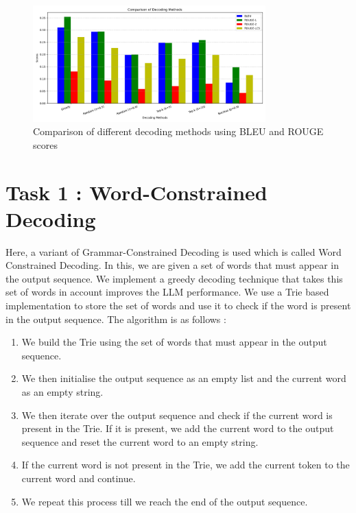 \documentclass[12pt]{article}
\begin{document}
\begin{figure}[htbp]
    \centering
    \includegraphics[width=0.8\textwidth]{decoding_methods.png}
    \caption{Comparison of different decoding methods using BLEU and ROUGE scores}
    \label{fig:decoding_comparison}
\end{figure}

\newpage

\section{Task 1 : Word-Constrained Decoding}

\noindent Here, a variant of Grammar-Constrained Decoding is used which is called Word Constrained Decoding. In this, we are given a set of words that must appear in the output sequence. We implement a greedy decoding technique that takes this set of words in account improves the LLM performance. We use a Trie based implementation to store the set of words and use it to check if the word is present in the output sequence. The algorithm is as follows :

\begin{enumerate}
    \item We build the Trie using the set of words that must appear in the output sequence.
    \item We then initialise the output sequence as an empty list and the current word as an empty string.
    \item We then iterate over the output sequence and check if the current word is present in the Trie. If it is present, we add the current word to the output sequence and reset the current word to an empty string.
    \item If the current word is not present in the Trie, we add the current token to the current word and continue.
    \item We repeat this process till we reach the end of the output sequence.
\end{enumerate}
\end{document}
